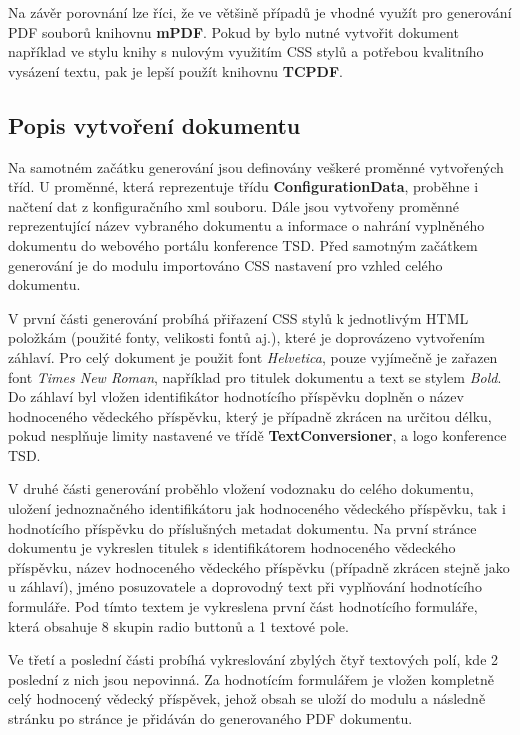 \par
Na závěr porovnání lze říci, že ve většině případů je vhodné využít pro generování PDF souborů knihovnu \textbf{mPDF}. Pokud by bylo nutné vytvořit dokument například ve stylu knihy s nulovým využitím CSS stylů a potřebou kvalitního vysázení textu, pak je lepší použít knihovnu \textbf{TCPDF}. 

\subsection{Popis vytvoření dokumentu}
Na samotném začátku generování jsou definovány veškeré proměnné vytvořených tříd. U proměnné, která reprezentuje třídu \textbf{ConfigurationData}, proběhne i načtení dat z konfiguračního xml souboru. Dále jsou vytvořeny proměnné reprezentující název vybraného dokumentu a informace o nahrání vyplněného dokumentu do webového portálu konference TSD. Před samotným začátkem generování je do modulu importováno CSS nastavení pro vzhled celého dokumentu.
\par
V první části generování probíhá přiřazení CSS stylů k jednotlivým HTML položkám (použité fonty, velikosti fontů aj.), které je doprovázeno vytvořením záhlaví. Pro celý dokument je použit font \textit{Helvetica}, pouze vyjímečně je zařazen font \textit{Times New Roman}, například pro titulek dokumentu a text se stylem \textit{Bold}. Do záhlaví byl vložen identifikátor hodnotícího příspěvku doplněn o název hodnoceného vědeckého příspěvku, který je případně zkrácen na určitou délku, pokud nesplňuje limity nastavené ve třídě \textbf{TextConversioner}, a logo konference TSD. 
\par
V druhé části generování proběhlo vložení vodoznaku do celého dokumentu, uložení jednoznačného identifikátoru jak hodnoceného vědeckého příspěvku, tak i hodnotícího příspěvku do příslušných metadat dokumentu. Na první stránce dokumentu je vykreslen titulek s identifikátorem hodnoceného vědeckého příspěvku, název hodnoceného vědeckého příspěvku (případně zkrácen stejně jako u záhlaví), jméno posuzovatele a doprovodný text při vyplňování hodnotícího formuláře. Pod tímto textem je vykreslena první část hodnotícího formuláře, která obsahuje 8 skupin radio buttonů a 1 textové pole.
\par
Ve třetí a poslední části probíhá vykreslování zbylých čtyř textových polí, kde 2 poslední z nich jsou nepovinná. Za hodnotícím formulářem je vložen kompletně celý hodnocený vědecký příspěvek, jehož obsah se uloží do modulu a následně stránku po stránce je přidáván do generovaného PDF dokumentu.
